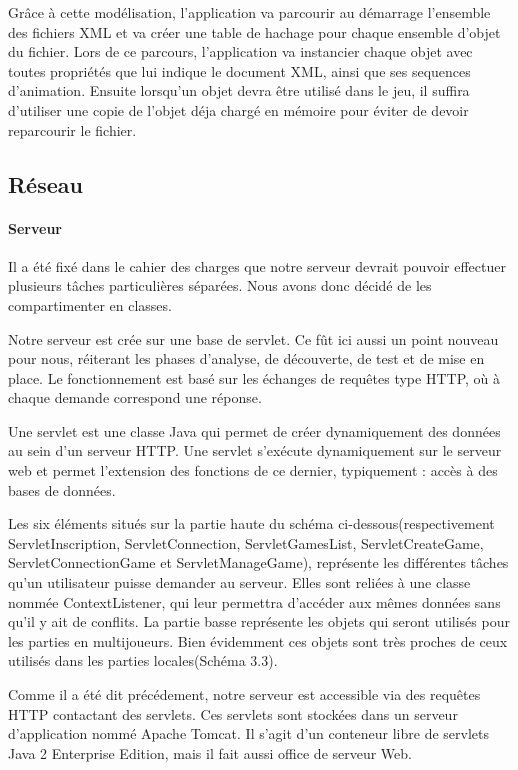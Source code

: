 		Grâce à cette modélisation, l'application va parcourir au démarrage l'ensemble des fichiers XML et va créer une table de hachage pour chaque ensemble d'objet du fichier. Lors de ce parcours, l'application va instancier chaque objet avec toutes propriétés que lui indique le document XML, ainsi que ses sequences d'animation. Ensuite lorsqu'un objet devra être utilisé dans le jeu, il suffira d'utiliser une copie de l'objet déja chargé en mémoire pour éviter de devoir reparcourir le fichier.


\subsection{Réseau}
		
	\paragraph{Serveur\\}
			
		Il a été fixé dans le cahier des charges que notre serveur devrait pouvoir
		effectuer plusieurs tâches particulières séparées. Nous avons donc décidé de
		les compartimenter en classes.
		
		Notre serveur est crée sur une base de servlet. Ce fût ici
		aussi un point nouveau pour nous, réiterant les phases d'analyse, de
		découverte, de test et de mise en place. Le fonctionnement est basé sur les
		échanges de requêtes type HTTP, où à chaque demande correspond une réponse. 
		
		Une servlet est une classe Java qui permet de créer dynamiquement des données
		au sein d'un serveur HTTP. Une servlet s'exécute dynamiquement sur le serveur
		web et permet l'extension des fonctions de ce dernier, typiquement : accès à
		des bases de données.
			
		Les six éléments situés sur la partie haute du schéma
		ci-dessous(respectivement ServletInscription, ServletConnection,
		ServletGamesList, ServletCreateGame, ServletConnectionGame et
		ServletManageGame), représente les différentes tâches qu'un utilisateur
		puisse demander au serveur. Elles sont reliées à une classe nommée
		ContextListener, qui leur permettra d'accéder aux mêmes données sans qu'il y
		ait de conflits. La partie basse représente les objets qui seront utilisés pour les parties en multijoueurs. 
		Bien évidemment ces objets sont très proches de ceux utilisés dans les parties
		locales(Schéma 3.3).
		
		
		Comme il a été dit précédement, notre serveur est accessible via des requêtes
		HTTP contactant des servlets. Ces servlets sont stockées dans un serveur
		d'application nommé Apache Tomcat. Il s'agit d'un conteneur libre de
		servlets Java 2 Enterprise Edition, mais il fait aussi office de serveur
		Web.\\
		
